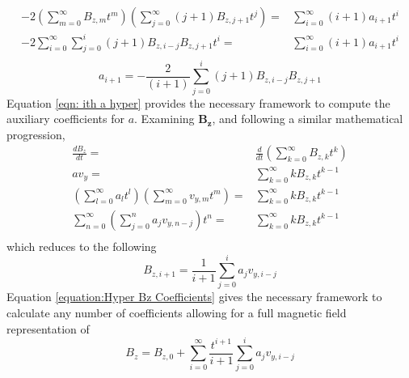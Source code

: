 \documentclass{article}
\begin{document}
    \begin{equation}
        \begin{split}            
            -2\left(\sum_{m=0}^\infty B_{z,m}t^m\right)\left(\sum_{j=0}^\infty (j+1)B_{z,j+1}t^{j}\right)=&\sum_{i=0}^\infty (i+1)a_{i+1}t^{i}\\
            -2\sum_{i=0}^\infty\sum_{j=0}^i(j+1)B_{z,i-j}B_{z,j+1}t^{i}=&\sum_{i=0}^\infty (i+1)a_{i+1}t^{i}\\
        \end{split}
    \end{equation}
    \begin{equation}\label{eqn: ith a hyper}
        a_{i+1}=-\frac{2}{(i+1)}\sum_{j=0}^i(j+1)B_{z,i-j}B_{z,j+1}
    \end{equation}
 Equation \ref{eqn: ith a hyper} provides the necessary framework to compute the auxiliary coefficients for $a$. Examining $\mathbf{B_z}$, and following a similar mathematical progression, 
    \begin{equation}
        \begin{split}
            \frac{dB_z}{dt}=&\frac{d}{dt}\left(\sum_{k=0}^\infty B_{z,k}t^k\right)\\
            av_y=&\sum_{k=0}^\infty kB_{z,k}t^{k-1}\\
            \left(\sum_{l=0}^\infty a_lt^l\right)\left(\sum_{m=0}^\infty v_{y,m}t^m\right)=&\sum_{k=0}^\infty kB_{z,k}t^{k-1}\\                  
            \sum_{n=0}^\infty \left(\sum_{j=0}^n a_jv_{y,n-j}\right)t^n=&\sum_{k=0}^\infty kB_{z,k}t^{k-1}\\
        \end{split}
    \end{equation}
which reduces to the following
    \begin{equation}\label{equation:Hyper Bz Coefficients}
            B_{z,i+1}=\frac{1}{i+1}\sum_{j=0}^i a_jv_{y,i-j}
    \end{equation}
Equation \ref{equation:Hyper Bz Coefficients} gives the necessary framework to calculate any number of coefficients allowing for a full magnetic field representation of  
    \begin{equation}\label{eqn_ith_B_hyper}
        B_z=B_{z,0}+\sum_{i=0}^\infty \frac{t^{i+1}}{i+1}\sum_{j=0}^i a_jv_{y,i-j}
    \end{equation}
\end{document}
